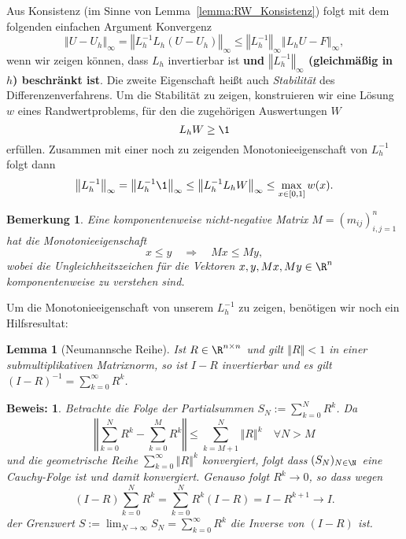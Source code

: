 \documentclass[
]{mycourse}
\theoremstyle{mythm}
\newtheorem{bemerkung}[theorem]{Bemerkung}
\newtheorem{lemma}[theorem]{Lemma}
\newtheorem{definition}[theorem]{Definition}
\theoremstyle{break}
\newtheorem*{beweis}{Beweis:}
\newcommand{\norm}[1]{\left\Vert#1\right\Vert}		%
\begin{document}
Aus Konsistenz (im Sinne von Lemma~\ref{lemma:RW_Konsistenz}) folgt mit 
dem folgenden einfachen Argument Konvergenz
\[
\norm{U-U_h}_\infty = \norm{L_h^{-1} L_h (U-U_h)}_\infty\leq \norm{L_h^{-1}}_\infty \norm{L_h U-F}_\infty,
\]
wenn wir zeigen können, dass $L_h$ invertierbar ist {\bf und $\norm{L_h^{-1}}_\infty$ (gleichmäßig in $h$) beschränkt ist}. Die zweite Eigenschaft heißt auch \emph{Stabilität} des Differenzenverfahrens. Um die Stabilität zu zeigen, 
konstruieren wir eine Lösung $w$ eines Randwertproblems, für den die zugehörigen Auswertungen $W$ 
\[
L_h W\geq \1
\]
erfüllen. Zusammen mit einer noch zu zeigenden Monotonieeigenschaft von $L_h^{-1}$ folgt
dann
\[
\norm{L_h^{-1}}_\infty = \norm{L_h^{-1} \1}_\infty \leq \norm{L_h^{-1} L_h W}_\infty\leq \max_{x\in [0,1]} w(x).
\]




\begin{bemerkung}\label{bem:monotonie}
Eine komponentenweise nicht-negative Matrix $M=(m_{ij})_{i,j=1}^n$ hat die Monotonieeigenschaft
\[
x\leq y \quad \Longrightarrow \quad Mx\leq My, 
\]
wobei die Ungleichheitszeichen für die Vektoren $x,y,Mx,My\in \R^n$ komponentenweise zu verstehen sind.
\end{bemerkung}


Um die Monotonieeigenschaft von unserem $L_h^{-1}$ zu zeigen, benötigen 
wir noch ein Hilfsresultat:

\begin{lemma}[Neumannsche Reihe]\label{lemma:NR}
Ist $R\in \R^{n\times n}$ und gilt $\norm{R}<1$ in einer submultiplikativen Matrixnorm,
so ist $I-R$ invertierbar und es gilt $(I-R)^{-1}=\sum_{k=0}^\infty R^k$.
\end{lemma}
\begin{beweis}
Betrachte die Folge der Partialsummen $S_N:=\sum_{k=0}^N R^k$. Da
\[
\norm{\sum_{k=0}^N R^k - \sum_{k=0}^M R^k}\leq \sum_{k=M+1}^N \norm{R}^k \quad \forall N>M
\]
und die geometrische Reihe $\sum_{k=0}^\infty \norm{R}^k$ konvergiert, folgt dass
$(S_N)_{N\in \N}$ eine Cauchy-Folge ist und damit konvergiert. 
Genauso folgt $R^k\to 0$, so dass wegen
\[
(I-R) \sum_{k=0}^N R^k= \sum_{k=0}^N R^k (I-R) = I- R^{k+1}\to I.
\]
der Grenzwert $S:=\lim_{N\to \infty}S_N=\sum_{k=0}^\infty R^k$  die Inverse von $(I-R)$ ist.
\end{beweis}
\end{document}
